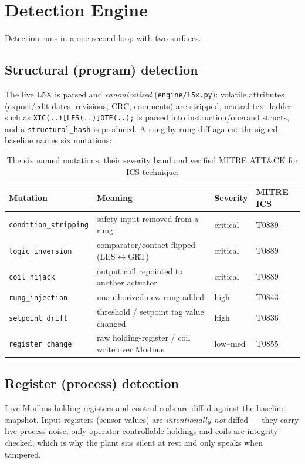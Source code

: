 \documentclass[11pt,a4paper]{article}
\newcommand{\code}[1]{\texttt{\small #1}}
\begin{document}
\section{Detection Engine}
Detection runs in a one-second loop with two surfaces.

\subsection{Structural (program) detection}
The live L5X is parsed and \emph{canonicalized} (\code{engine/l5x.py}): volatile attributes
(export/edit dates, revisions, CRC, comments) are stripped, neutral-text ladder such as
\code{XIC(..)[LES(..)]OTE(..);} is parsed into instruction/operand structs, and a
\code{structural\_hash} is produced. A rung-by-rung diff against the signed baseline names six
mutations:

\begin{table}[h]\small\centering
\renewcommand{\arraystretch}{1.2}
\begin{tabularx}{\textwidth}{@{}l L l l@{}}
\toprule
\textbf{Mutation} & \textbf{Meaning} & \textbf{Severity} & \textbf{MITRE ICS}\\
\midrule
\code{condition\_stripping} & safety input removed from a rung & critical & T0889 \\
\code{logic\_inversion}     & comparator/contact flipped (LES$\leftrightarrow$GRT) & critical & T0889 \\
\code{coil\_hijack}         & output coil repointed to another actuator & critical & T0889 \\
\code{rung\_injection}      & unauthorized new rung added & high & T0843 \\
\code{setpoint\_drift}      & threshold / setpoint tag value changed & high & T0836 \\
\code{register\_change}     & raw holding-register / coil write over Modbus & low--med & T0855 \\
\bottomrule
\end{tabularx}
\caption{The six named mutations, their severity band and verified MITRE ATT\&CK for ICS technique.}
\end{table}

\subsection{Register (process) detection}
Live Modbus holding registers and control coils are diffed against the baseline snapshot. Input
registers (sensor values) are \emph{intentionally not} diffed --- they carry live process noise;
only operator-controllable holdings and coils are integrity-checked, which is why the plant sits
silent at rest and only speaks when tampered.
\end{document}

